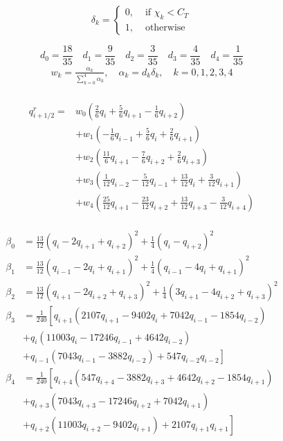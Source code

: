 \begin{equation}
\delta_{k}=\left\{\begin{array}{ll}
0, & \text { if } \chi_{k}<C_{T} \\
1, & \text { otherwise }
\end{array}\right.
\end{equation}

$$d_0=\frac{18}{35} \quad d_1=\frac{9}{35} \quad d_2=\frac{3}{35} \quad d_3=\frac{4}{35} \quad d_4=\frac{1}{35}$$
\begin{equation}
\begin{array}{l}
w_{k}=\frac{\alpha_{k}}{\sum_{k=0}^{4} \alpha_{k}}, \quad \alpha_{k}=d_k\delta_k, \quad k=0,1,2,3,4\\
\end{array}
\end{equation}


\begin{equation}
\begin{aligned}
q_{i+1 / 2}^{r}=& w_{0}\left(\frac{2}{6} q_{i}+\frac{5}{6} q_{i+1}-\frac{1}{6} q_{i+2}\right) \\
&+w_{1}\left(-\frac{1}{6} q_{i-1}+\frac{5}{6} q_{i}+\frac{2}{6} q_{i+1}\right) \\
&+w_{2}\left(\frac{11}{6} q_{i+1}-\frac{7}{6} q_{i+2}+\frac{2}{6} q_{i+3}\right) \\
&+w_{3}\left(\frac{1}{12} q_{i-2}-\frac{5}{12} q_{i-1}+\frac{13}{12} q_{i}+\frac{3}{12}q_{i+1}\right) \\
&+w_{4}\left(\frac{25}{12} q_{i+1}-\frac{23}{12} q_{i+2}+\frac{13}{12} q_{i+3}-\frac{3}{12}q_{i+4}\right) \\
\end{aligned}
\end{equation}

\begin{equation}
\begin{aligned}
\beta_{0}&=\frac{13}{12}\left(q_{i}-2 q_{i+1}+q_{i+2}\right)^{2}+\frac{1}{4}\left(q_{i}-q_{i+2}\right)^{2}\\
\beta_{1}&=\frac{13}{12}\left(q_{i-1}-2 q_{i}+q_{i+1}\right)^{2}+\frac{1}{4}\left(q_{i-1}-4 q_{i}+q_{i+1}\right)^{2}\\
\beta_{2}&=\frac{13}{12}\left(q_{i+1}-2 q_{i+2}+q_{i+3}\right)^{2}+\frac{1}{4}\left(3q_{i+1}-4 q_{i+2}+q_{i+3}\right)^{2}\\
\beta_{3} &=\frac{1}{240}\left[q_{i+1}\left(2107 q_{i+1}-9402 q_{i}+7042 q_{i-1}-1854 q_{i-2}\right)\right.\\
&+q_{i}\left(11003 q_{i}-17246 q_{i-1}+4642 q_{i-2}\right) \\
&\left.+q_{i-1}\left(7043 q_{i-1}-3882 q_{i-2}\right)+547 q_{i-2} q_{i-2}\right] \\
\beta_{4} &=\frac{1}{240}\left[q_{i+4}\left(547 q_{i+4}-3882 q_{i+3}+4642 q_{i+2}-1854 q_{i+1}\right)\right.\\
&+q_{i+3}\left(7043 q_{i+3}-17246 q_{i+2}+7042 q_{i+1}\right) \\
&\left.+q_{i+2}\left(11003 q_{i+2}-9402 q_{i+1}\right)+2107 q_{i+1} q_{i+1}\right]
\end{aligned}
\end{equation}


